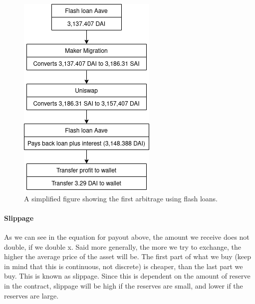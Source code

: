 \begin{figure}
  \centering
  \includegraphics[width=.2\textwidth]{assests/Flash-loans-18-jan}
  \caption{A simplified figure showing the first arbitrage using flash loans.}
  \label{fig:firstArb}
\end{figure}
\paragraph{Slippage}
As we can see in the equation for payout above, the amount we receive does
not double, if we double x. Said more generally, the more we try to exchange,
the higher the average price of the asset will be. The first part of what we buy
(keep in mind that this is continuous, not discrete) is cheaper, than the last
part we buy. This is known as slippage. Since this is dependent on the amount of
reserve in the contract, slippage will be high if the reserves are small, and
lower if the reserves are large.
